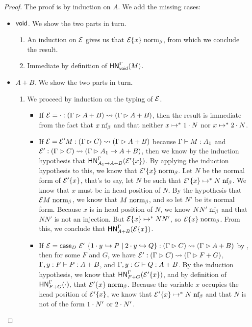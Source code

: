 \documentclass{article}
\begin{document}
\begin{proof}
  The proof is by induction on $A$.
  We add the missing cases:
  \begin{itemize}
  \item $\mathsf{void}$. We show the two parts in turn.
    \begin{enumerate}
    \item An induction on $\mathcal{E}$ gives us that $\mathcal{E}\{x\} \mathrel{\text{norm}_\beta}$, from which we conclude the result.
    \item Immediate by definition of $\mathsf{HN}^{\Gamma}_{\mathsf{void}}(M)$.
    \end{enumerate}
  \item $A + B$. We show the two parts in turn.
    \begin{enumerate}
    \item We proceed by induction on the typing of $\mathcal{E}$.
      \begin{itemize}
      \item If $\mathcal{E} = \cdot : (\Gamma \rhd A + B) \leadsto (\Gamma \rhd A + B)$, then the result is immediate from the fact that $x \mathrel{\text{nf}_\beta}$ and that neither $x \mapsto^* 1\cdot N$ nor $x \mapsto^* 2\cdot N$.
      \item If $\mathcal{E} = \mathcal{E}' M : (\Gamma \rhd C) \leadsto (\Gamma \rhd A+B)$ because $\Gamma \vdash M : A_1$ and $\mathcal{E}' : (\Gamma \rhd C) \leadsto (\Gamma \rhd A_1 \to A+B)$, then we know by the induction hypothesis that $\mathsf{HN}^{\Gamma}_{A_1 \to A + B}(\mathcal{E}'\{x\})$.
        By applying the induction hypothesis to this, we know that $\mathcal{E}'\{x\} \mathrel{\text{norm}_\beta}$.
        Let $N$ be the normal form of $\mathcal{E}'\{x\}$, that's to say, let $N$ be such that $\mathcal{E}'\{x\} \mapsto^* N \mathrel{\text{nf}_\beta}$.
        We know that $x$ must be in head position of $N$.
        By the hypothesis that $\mathcal{E} M \mathrel{\text{norm}_\beta}$, we know that $M \mathrel{\text{norm}_\beta}$, and so let $N'$ be its normal form.
        Because $x$ is in head position of $N$, we know $NN' \mathrel{\text{nf}_\beta}$ and that $NN'$ is not an injection.
        But $\mathcal{E}\{x\} \mapsto^* NN'$, so $\mathcal{E}\{x\} \mathrel{\text{norm}_\beta}$.
        From this, we conclude that $\mathsf{HN}^{\Gamma}_{A+B}(\mathcal{E}\{x\})$.
      \item If $\mathcal{E} = \mathsf{case}_{D}\ \mathcal{E}'\ \{1\cdot y \hookrightarrow P \mid 2\cdot y \hookrightarrow Q\} : (\Gamma \rhd C) \leadsto (\Gamma \rhd A + B)$ by , then for some $F$ and $G$, we have $\mathcal{E}' : (\Gamma \rhd C) \leadsto (\Gamma \rhd F + G)$, $\Gamma, y:F \vdash P : A+B$, and $\Gamma, y:G \vdash Q : A+B$.
        By the induction hypothesis, we know that $\mathsf{HN}^{\Gamma}_{F + G}(\mathcal{E}'\{x\})$, and by definition of $\mathsf{HN}^{\Gamma}_{F + G}(\cdot)$, that $\mathcal{E}'\{x\} \mathrel{\text{norm}_\beta}$.
        Because the variable $x$ occupies the head position of $\mathcal{E}'\{x\}$, we know that $\mathcal{E}'\{x\} \mapsto^* N \mathrel{\text{nf}_\beta}$ and that $N$ is not of the form $1\cdot N'$ or $2\cdot N'$.

\end{itemize}
\end{enumerate}
\end{itemize}
\end{proof}
\end{document}
